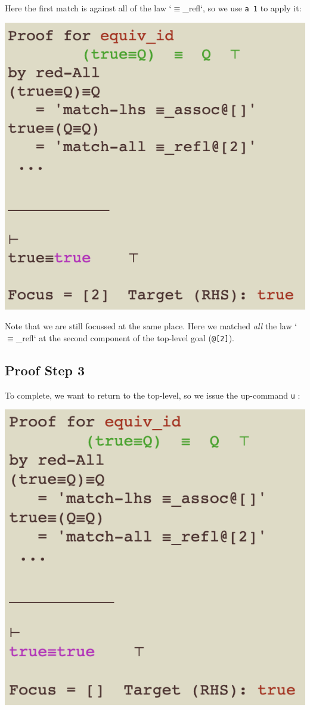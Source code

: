 \documentclass[11pt]{article}
\begin{document}
Here the first match is against all of the law `$\equiv$\_refl`,
so we use \verb"a 1" to apply it:

\includegraphics[scale=0.75]{doc/images/5-a1.png}


Note that we are still focussed at the same place. Here we matched \emph{all} the law `$\equiv$\_refl` at the second component of the top-level goal (\verb"@[2]").

\subsection{Proof Step 3}

To complete, we want to return to the top-level,
so we issue the up-command \verb"u" :

\includegraphics[scale=0.75]{doc/images/6-u.png}
\end{document}
